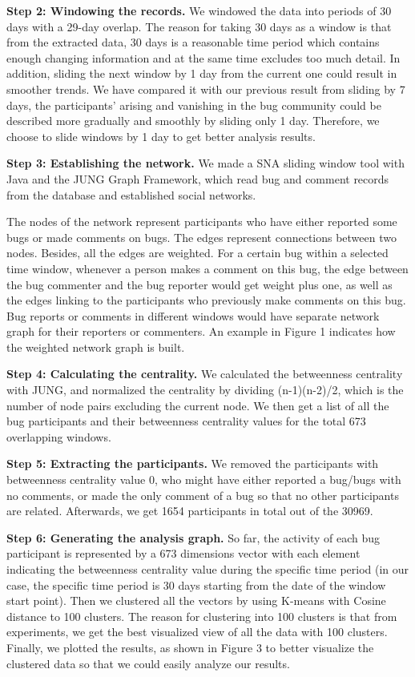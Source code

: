 \documentclass[10pt, conference, compsocconf]{IEEEtran}
\begin{document}
\textbf{Step 2: Windowing the records.} We windowed the data into periods of 30 days with a 29-day overlap. The reason for taking 30 days as a window is that from the extracted data, 30 days is a reasonable time period which contains enough changing information and at the same time excludes too much detail. In addition, sliding the next window by 1 day from the current one could result in smoother trends. We have compared it with our previous result from sliding by 7 days, the participants' arising and vanishing in the bug community could be described more gradually and smoothly by sliding only 1 day. Therefore, we choose to slide windows by 1 day to get better analysis results.

\textbf{Step 3: Establishing the network.} We made a SNA sliding window tool with Java and the JUNG Graph Framework, which read bug and comment records from the database and established social networks.

The nodes of the network represent participants who have either reported some bugs or made comments on bugs. The edges represent connections between two nodes. Besides, all the edges are weighted. For a certain bug within a selected time window, whenever a person makes a comment on this bug, the edge between the bug commenter and the bug reporter would get weight plus one, as well as the edges linking to the participants who previously make comments on this bug. Bug reports or comments in different windows would have separate network graph for their reporters or commenters. An example in Figure 1 indicates how the weighted network graph is built.

\textbf{Step 4: Calculating the centrality.} We calculated the betweenness centrality with JUNG, and normalized the centrality by dividing (n-1)(n-2)/2, which is the number of node pairs excluding the current node. We then get a list of all the bug participants and their betweenness centrality values for the total 673 overlapping windows.

\textbf{Step 5: Extracting the participants.} We removed the participants with betweenness centrality value 0, who might have either reported a bug/bugs with no comments, or made the only comment of a bug so that no other participants are related. Afterwards, we get 1654 participants in total out of the 30969.

\textbf{Step 6: Generating the analysis graph.} So far, the activity of each bug participant is represented by a 673 dimensions vector with each element indicating the betweenness centrality value during the specific time period (in our case, the specific time period is 30 days starting from the date of the window start point). Then we clustered all the vectors by using K-means with Cosine distance to 100 clusters. The reason for clustering into 100 clusters is that from experiments, we get the best visualized view of all the data with 100 clusters. Finally, we plotted the results, as shown in Figure 3 to better visualize the clustered data so that we could easily analyze our results.
\end{document}
